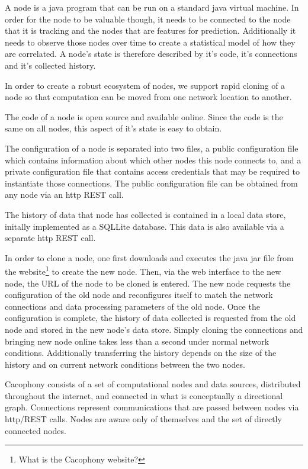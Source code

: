 A \Cacophony node is a java program that can be run on a standard java virtual
machine.  In order for the node to be valuable though, it needs to be connected
to the node that it is tracking and the nodes that are features for prediction.
Additionally it needs to observe those nodes over time to create a statistical
model of how they are correlated.  A node's state is therefore described by it's code,
it's connections and it's collected history.

In order to create a robust ecosystem of \Cacophony nodes, we support rapid
cloning of a node so that computation can be moved from one network location to
another.

The code of a \Cacophony node is open source and available online.  Since the
code is the same on all nodes, this aspect of it's state is easy to obtain.

The configuration of a \Cacophony node is separated into two files, a public
configuration file which contains information about which other nodes this node
connects to, and a private configuration file that contains access credentials
that may be required to instantiate those connections.  The public configuration
file can be obtained from any \Cacophony node via an http REST call.

The history of data that \Cacophony node has collected is contained in a local data store, initally
implemented as a SQLLite database.   This data is also available via a separate http
REST call.

In order to clone a \Cacophony node, one first downloads and executes the java
jar file from the \Cacophony website\footnote{What is the Cacophony website?} to
create the new node.
Then, via the web interface to the new node, the URL of the node to be cloned is
entered.  The new node requests the configuration of the old node and
reconfigures itself to match the network connections and data processing
parameters of the old node.  Once the configuration is complete, the history of
data collected is requested from the old node and stored in the new node's data
store.  Simply cloning the connections and bringing new \Cacophony node online takes less than a second under normal
network conditions.  Additionally transferring the history depends on the size
of the history and on current network conditions between the two nodes.






Cacophony consists of a set of computational nodes and data sources, distributed throughout the
internet, and connected in what is conceptually a directional graph.  Connections
represent communications that are passed between nodes via http/REST calls. Nodes are
aware only of themselves and the set of directly connected nodes.







